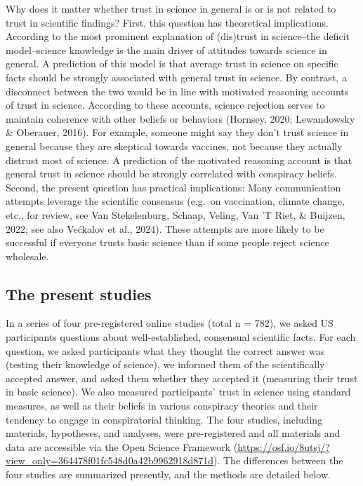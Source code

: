 \documentclass[
  doc,floatsintext]{apa6}
\begin{document}
Why does it matter whether trust in science in general is or is not related to trust in scientific findings? First, this question has theoretical implications. According to the most prominent explanation of (dis)trust in science--the deficit model--science knowledge is the main driver of attitudes towards science in general. A prediction of this model is that average trust in science on specific facts should be strongly associated with general trust in science. By contrast, a disconnect between the two would be in line with motivated reasoning accounts of trust in science. According to these accounts, science rejection serves to maintain coherence with other beliefs or behaviors (Hornsey, 2020; Lewandowsky \& Oberauer, 2016). For example, someone might say they don't trust science in general because they are skeptical towards vaccines, not because they actually distrust most of science. A prediction of the motivated reasoning account is that general trust in science should be strongly correlated with conspiracy beliefs. Second, the present question has practical implications: Many communication attempts leverage the scientific consensus (e.g.~on vaccination, climate change, etc., for review, see Van Stekelenburg, Schaap, Veling, Van 'T Riet, \& Buijzen, 2022; see also Većkalov et al., 2024). These attempts are more likely to be successful if everyone trusts basic science than if some people reject science wholesale.

\subsection{The present studies}\label{the-present-studies}

In a series of four pre-registered online studies (total n = 782), we asked US participants questions about well-established, consensual scientific facts. For each question, we asked participants what they thought the correct answer was (testing their knowledge of science), we informed them of the scientifically accepted answer, and asked them whether they accepted it (measuring their trust in basic science). We also measured participants' trust in science using standard measures, as well as their beliefs in various conspiracy theories and their tendency to engage in conspiratorial thinking. The four studies, including materials, hypotheses, and analyses, were pre-registered and all materials and data are accessible via the Open Science Framework (\url{https://osf.io/8utsj/?view_only=364478f01fc548d0a42b9962918d871d}). The differences between the four studies are summarized presently, and the methods are detailed below.
\end{document}
